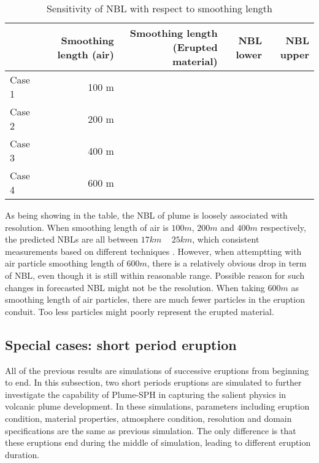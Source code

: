 \begin{table}[htp]
\centering
	\begin{centering}
      \caption{Sensitivity of NBL with respect to smoothing length}		
	  \begin{tabular}{lrrrr}
	    \hline
	           & Smoothing \newline length (air) & Smoothing length \newline (Erupted material) & NBL lower & NBL upper\\
	    \hline
	    Case 1 & 100 m& & &  \\
	    Case 2 & 200 m& & &  \\
	    Case 3 & 400 m& & &  \\
	    Case 4 & 600 m& & &  \\
	    \hline
	  \end{tabular}
	  \label{tab:sml-sensitivity}
	\end{centering}
\end{table}

As being showing in the table, the NBL of plume is loosely associated with resolution. When smoothing length of air is $100 m$, $200 m$ and $400 m$ respectively, the predicted NBLs are all between $17 km$ ~ $25 km$, which consistent measurements based on different techniques \citep[][e.g.]{defoor1992early, deshler1992balloonborne, self1993atmospheric}. However, when attemptting with air particle smoothing length of $600 m$, there is a relatively obvious drop in term of NBL, even though it is still within reasonable range. Possible reason for such changes in forecasted NBL might not be the resolution. When taking $600 m$ as smoothing length of air particles, there are much fewer particles in the eruption conduit. Too less particles might poorly represent the erupted material.

\subsection{Special cases: short period eruption}
All of the previous results are simulations of successive eruptions from beginning to end. In this subsection, two short periods eruptions are simulated to further investigate the capability of Plume-SPH in capturing the salient physics in volcanic plume development. In these simulations, parameters including eruption condition, material properties, atmosphere condition, resolution and domain specifications are the same as previous simulation. The only difference is that these eruptions end during the middle of simulation, leading to different eruption duration.

